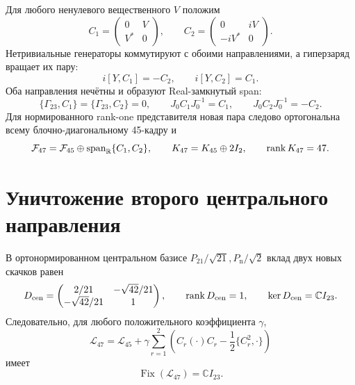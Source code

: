 Для любого ненулевого вещественного $V$ положим
\begin{equation}
 C_1=\begin{pmatrix}0&V\\V^*&0\end{pmatrix},
 \qquad
 C_2=\begin{pmatrix}0&iV\\-iV^*&0\end{pmatrix}.
 \label{eq:v8-baryon-c0-old-new-hermitian-quadratures}
\end{equation}
Нетривиальные генераторы коммутируют с обоими направлениями, а гиперзаряд
вращает их пару:
\begin{equation}
 i[Y,C_1]=-C_2,
 \qquad i[Y,C_2]=C_1.
 \label{eq:v8-baryon-c0-old-new-u1-frame-rotation}
\end{equation}
Оба направления нечётны и образуют Real-замкнутый span:
\begin{equation}
 \{\Gamma_{23},C_1\}=\{\Gamma_{23},C_2\}=0,
 \qquad J_0C_1J_0^{-1}=C_1,
 \qquad J_0C_2J_0^{-1}=-C_2.
 \label{eq:v8-baryon-c0-old-new-grading-real-closure}
\end{equation}
Для нормированного rank-one представителя новая пара следово ортогональна
всему блочно-диагональному 45-кадру и
\begin{equation}
 \mathcal F_{47}=\mathcal F_{45}\oplus
 \operatorname{span}_{\mathbb R}\{C_1,C_2\},
 \qquad
 K_{47}=K_{45}\oplus2I_2,
 \qquad \operatorname{rank} K_{47}=47.
 \label{eq:v8-baryon-c0-old-new-frame-47-metric}
\end{equation}

\section{Уничтожение второго центрального направления}

В ортонормированном центральном базисе
$P_{21}/\sqrt{21},P_{\mathrm n}/\sqrt2$ вклад двух новых скачков равен
\begin{equation}
 D_{\rm cen}=
 \begin{pmatrix}
 2/21&-\sqrt{42}/21\\
 -\sqrt{42}/21&1
 \end{pmatrix},
 \qquad \operatorname{rank} D_{\rm cen}=1,
 \qquad \ker D_{\rm cen}=\mathbb C I_{23}.
 \label{eq:v8-baryon-c0-old-new-central-dirichlet-matrix}
\end{equation}
Следовательно, для любого положительного коэффициента $\gamma$,
\begin{equation}
 \mathcal L_{47}=\mathcal L_{45}
 +\gamma\sum_{r=1}^{2}
 \left(C_r(\cdot)C_r-\frac12\{C_r^2,\cdot\}\right)
 \label{eq:v8-baryon-c0-old-new-connected-generator}
\end{equation}
имеет
\begin{equation}
 \operatorname{Fix}(\mathcal L_{47})=\mathbb C I_{23}.
 \label{eq:v8-baryon-c0-old-new-scalar-fixed-algebra}
\end{equation}

